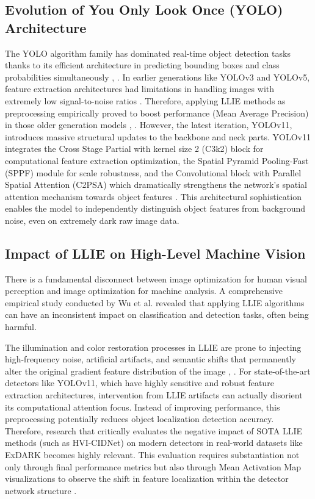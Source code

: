 \documentclass[conference]{IEEEtran}
\begin{document}
\subsection{Evolution of You Only Look Once (YOLO) Architecture} The YOLO algorithm family has dominated real-time object detection tasks thanks to its efficient architecture in predicting bounding boxes and class probabilities simultaneously \cite{terven2023yoloreview}, \cite{sapkota2025yoloreview}. In earlier generations like YOLOv3 and YOLOv5, feature extraction architectures had limitations in handling images with extremely low signal-to-noise ratios \cite{wang2023yolov5lowlight}. Therefore, applying LLIE methods as preprocessing empirically proved to boost performance (Mean Average Precision) in those older generation models \cite{shovo2024lowlight}, \cite{peng2024yolov5llie}.
However, the latest iteration, YOLOv11, introduces massive structural updates to the backbone and neck parts. YOLOv11 integrates the Cross Stage Partial with kernel size 2 (C3k2) block for computational feature extraction optimization, the Spatial Pyramid Pooling-Fast (SPPF) module for scale robustness, and the Convolutional block with Parallel Spatial Attention (C2PSA) which dramatically strengthens the network's spatial attention mechanism towards object features \cite{khanam2024yolov11}. This architectural sophistication enables the model to independently distinguish object features from background noise, even on extremely dark raw image data.

\subsection{Impact of LLIE on High-Level Machine Vision} There is a fundamental disconnect between image optimization for human visual perception and image optimization for machine analysis. A comprehensive empirical study conducted by Wu et al. \cite{wu2024llieeffect} revealed that applying LLIE algorithms can have an inconsistent impact on classification and detection tasks, often being harmful.

The illumination and color restoration processes in LLIE are prone to injecting high-frequency noise, artificial artifacts, and semantic shifts that permanently alter the original gradient feature distribution of the image \cite{wang2023yolov5lowlight}, \cite{gong2025multiscale}. For state-of-the-art detectors like YOLOv11, which have highly sensitive and robust feature extraction architectures, intervention from LLIE artifacts can actually disorient its computational attention focus. Instead of improving performance, this preprocessing potentially reduces object localization detection accuracy. Therefore, research that critically evaluates the negative impact of SOTA LLIE methods (such as HVI-CIDNet) on modern detectors in real-world datasets like ExDARK \cite{loh2019exdark} becomes highly relevant. This evaluation requires substantiation not only through final performance metrics but also through Mean Activation Map visualizations to observe the shift in feature localization within the detector network structure \cite{metrics2026formulas}.
\end{document}
